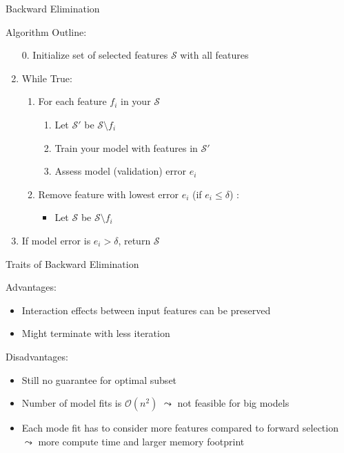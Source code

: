 \documentclass[aspectratio=169]{../latex_main/tntbeamer}  %
\begin{document}
	\begin{frame}[c]{Backward Elimination}

    Algorithm Outline:
    \begin{enumerate}
        \item[0.] Initialize set of selected features $\mathcal{S}$ with all features
        \item While True:
        \begin{enumerate}
            \item For each feature $f_i$ in your $\mathcal{S}$
            \begin{enumerate}
                \item Let $\mathcal{S}'$ be $\mathcal{S} \setminus f_i$
                \item Train your model with features in $\mathcal{S}'$
                \item Assess model (validation) error $e_i$
            \end{enumerate}
            \item Remove feature with lowest error $e_i$ (if $e_i \leq \delta$) : 
            \begin{itemize}
                \item Let $\mathcal{S}$ be  $\mathcal{S} \setminus f_i$
            \end{itemize}
        \end{enumerate}
        \item If model error is $e_i > \delta$, return $\mathcal{S}$
    \end{enumerate}

	\end{frame}
	
	\begin{frame}{Traits of Backward Elimination}
    
    Advantages:
    \begin{itemize}
        \item Interaction effects between input features can be preserved
        \item Might terminate with less iteration
    \end{itemize}

    Disadvantages:
    \begin{itemize}
        \item Still no guarantee for optimal subset
        \item Number of model fits is $\mathcal{O}(n^2)$ $\leadsto$ not feasible for big models
        \item Each mode fit has to consider more features compared to forward selection $\leadsto$ more compute time and larger memory footprint
    \end{itemize}

	\end{frame}
	
\end{document}
